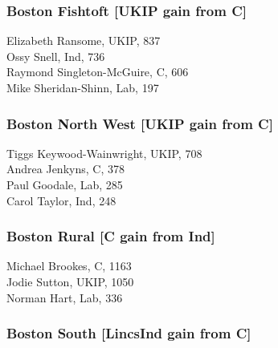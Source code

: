 \documentclass[a4paper,openany,10pt]{book}
\begin{document}
\subsubsection*{Boston Fishtoft \hspace*{\fill}\nolinebreak[1]%
\enspace\hspace*{\fill}
[UKIP gain from C]}



Elizabeth Ransome, UKIP, 837\\
Ossy Snell, Ind, 736\\
Raymond Singleton-McGuire, C, 606\\
Mike Sheridan-Shinn, Lab, 197\\


\subsubsection*{Boston North West \hspace*{\fill}\nolinebreak[1]%
\enspace\hspace*{\fill}
[UKIP gain from C]}



{Tiggs Keywood-Wainwright}, UKIP, 708\\
Andrea Jenkyns, C, 378\\
Paul Goodale, Lab, 285\\
Carol Taylor, Ind, 248\\


\subsubsection*{Boston Rural \hspace*{\fill}\nolinebreak[1]%
\enspace\hspace*{\fill}
[C gain from Ind]}



Michael Brookes, C, 1163\\
Jodie Sutton, UKIP, 1050\\
Norman Hart, Lab, 336\\


\subsubsection*{Boston South \hspace*{\fill}\nolinebreak[1]%
\enspace\hspace*{\fill}
[LincsInd gain from C]}
\end{document}
